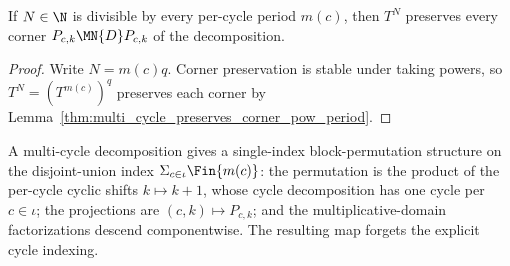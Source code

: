 \begin{lemma}
    \label{thm:multi_cycle_preserves_corner_pow_of_dvd}
    \leanok
    If $N\in\N$ is divisible by every per-cycle period $m(c)$, then $T^N$
    preserves every corner $P_{c,k}\MN{D}P_{c,k}$ of the decomposition.
\end{lemma}

\begin{proof}
    \leanok
    Write $N=m(c)q$. Corner preservation is stable under taking powers, so
    $T^N=(T^{m(c)})^q$ preserves each corner by
    Lemma~\ref{thm:multi_cycle_preserves_corner_pow_period}.
\end{proof}

\begin{definition}
    \label{def:multi_cycle_to_cycle_structure}
    \leanok
    A multi-cycle decomposition gives a single-index block-permutation
    structure on the disjoint-union index
    $\Sigma_{c\in\iota}\Fin{m(c)}$: the permutation is the product of the
    per-cycle cyclic shifts $k\mapsto k+1$, whose cycle decomposition has
    one cycle per $c\in\iota$; the projections are
    $(c,k)\mapsto P_{c,k}$; and the multiplicative-domain factorizations
    descend componentwise. The resulting map forgets the explicit cycle
    indexing.
\end{definition}
